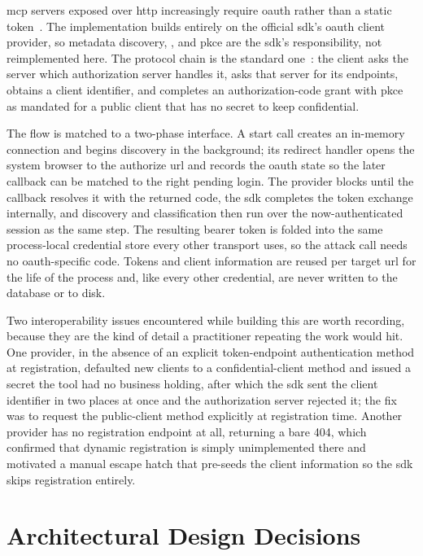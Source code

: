 \gls{mcp} servers exposed over \gls{http} increasingly require \gls{oauth} rather than a static token~\cite{mcp2025spec}. The implementation builds entirely on the official \gls{sdk}'s \gls{oauth} client provider, so metadata discovery, , and \gls{pkce} are the \gls{sdk}'s responsibility, not reimplemented here. The protocol chain is the standard one~\cite{rfc6749}: the client asks the server which authorization server handles it, asks that server for its endpoints, obtains a client identifier, and completes an authorization-code grant with \gls{pkce}~\cite{rfc7636} as mandated for a public client that has no secret to keep confidential.

The flow is matched to a two-phase interface. A start call creates an in-memory connection and begins discovery in the background; its redirect handler opens the system browser to the authorize \gls{url} and records the \gls{oauth} state so the later callback can be matched to the right pending login. The provider blocks until the callback resolves it with the returned code, the \gls{sdk} completes the token exchange internally, and discovery and classification then run over the now-authenticated session as the same step. The resulting bearer token is folded into the same process-local credential store every other transport uses, so the attack call needs no \gls{oauth}-specific code. Tokens and client information are reused per target \acrshort{url} for the life of the process and, like every other credential, are never written to the database or to disk.

Two interoperability issues encountered while building this are worth recording, because they are the kind of detail a practitioner repeating the work would hit. One provider, in the absence of an explicit token-endpoint authentication method at registration, defaulted new clients to a confidential-client method and issued a secret the tool had no business holding, after which the \gls{sdk} sent the client identifier in two places at once and the authorization server rejected it; the fix was to request the public-client method explicitly at registration time. Another provider has no registration endpoint at all, returning a bare 404, which confirmed that dynamic registration is simply unimplemented there and motivated a manual escape hatch that pre-seeds the client information so the \gls{sdk} skips registration entirely.

\section{Architectural Design Decisions}
\label{sec:decisions}

